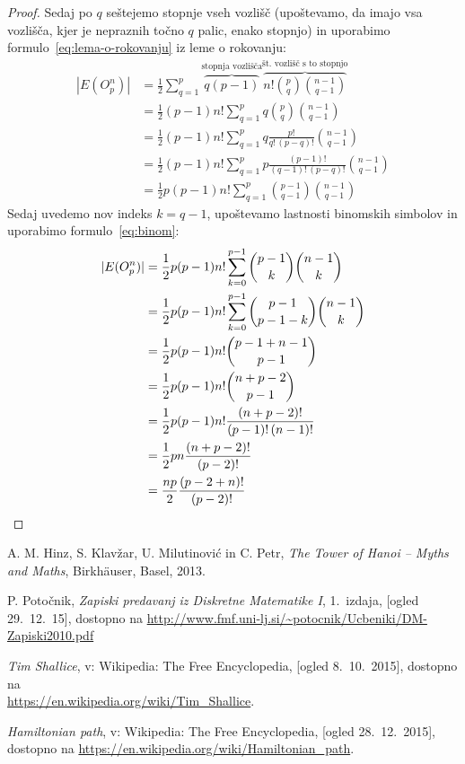 \documentclass[11pt,a4paper]{article}
\theoremstyle{definition} %
\theoremstyle{plain} %
\begin{document}
\begin{proof}
    Sedaj po $q$ seštejemo stopnje vseh vozlišč (upoštevamo, da imajo vsa vozlišča, kjer je nepraznih točno $q$ palic, enako stopnjo) in uporabimo formulo~\eqref{eq:lema-o-rokovanju} iz leme o rokovanju:
    \begin{align*}
    |E(O^n_p)|
    &= \frac{1}{2} \sum_{q=1}^{p} \overbrace{q(p-1)}^{\text{stopnja vozlišča}} 
    \overbrace{n! {p \choose q} {n-1 \choose q-1} }^{\text{št.~vozlišč s to stopnjo}} \\
    &= \frac{1}{2} (p-1) n! \sum_{q=1}^{p} q {p \choose q} {n-1 \choose q-1} \\
    &= \frac{1}{2} (p-1) n! \sum_{q=1}^{p} q \frac{p!}{q! \, (p-q)!} {n-1 \choose q-1} \\
    &= \frac{1}{2} (p-1) n! \sum_{q=1}^{p} p \frac{(p-1)!}{(q-1)! \, (p-q)!} {n-1 \choose q-1} \\
    &= \frac{1}{2} p (p-1) n! \sum_{q=1}^{p} {p-1 \choose q-1} {n-1 \choose q-1}
    \end{align*}
    Sedaj uvedemo nov indeks $k = q-1$, upoštevamo lastnosti binomskih simbolov in uporabimo formulo~\eqref{eq:binom}:
    \begin{align*}
    |E(O^n_p)|
    &= \frac{1}{2} p (p-1) n! \sum_{k=0}^{p-1} {p-1 \choose k} {n-1 \choose k} \\
    &= \frac{1}{2} p (p-1) n! \sum_{k=0}^{p-1} {p-1 \choose p-1-k} {n-1 \choose k} \\
    &= \frac{1}{2} p (p-1) n! {p-1 + n-1 \choose p-1} \\
    &= \frac{1}{2} p (p-1) n! {n + p - 2 \choose p-1} \\
    &= \frac{1}{2} p (p-1) n! \frac{(n+p-2)!}{(p-1)!\,(n-1)!} \\
    &= \frac{1}{2} p n \frac{(n+p-2)!}{(p-2)!} \\
    &= \frac{np}{2} \frac{(p-2+n)!}{(p-2)!} \qedhere
    \end{align*}
\end{proof}

\begin{thebibliography}{99}

 A. M. Hinz, S. Klavžar, U. Milutinović in C. Petr, \emph{The Tower of Hanoi – Myths and Maths}, Birkhäuser, Basel, 2013.

 P. Potočnik, \emph{Zapiski predavanj iz Diskretne Matematike I}, 1.~izdaja, [ogled 29.~12.~15], dostopno na \url{http://www.fmf.uni-lj.si/~potocnik/Ucbeniki/DM-Zapiski2010.pdf}

 \emph{Tim Shallice}, v: Wikipedia: The Free Encyclopedia, [ogled 8.~10.~2015], dostopno na\\ \url{https://en.wikipedia.org/wiki/Tim_Shallice}.

 \emph{Hamiltonian path}, v: Wikipedia: The Free Encyclopedia, [ogled 28.~12.~2015], dostopno na \url{https://en.wikipedia.org/wiki/Hamiltonian_path}.
\end{thebibliography}
\end{document}
